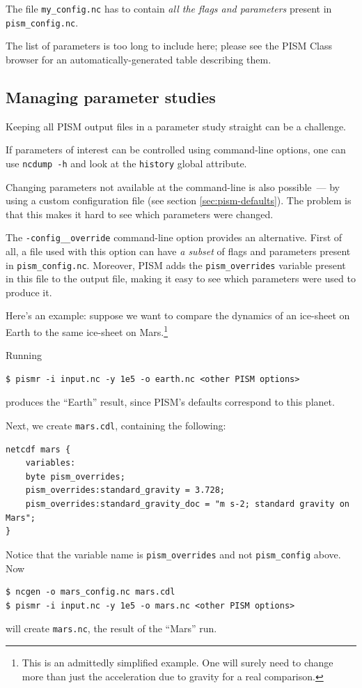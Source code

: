 \documentclass[11pt,final]{amsart}
\newcommand{\und}{\_\!\_}
\newcommand{\pismoptionindex}[1]{\index{options for PISM (and PETSc)!\texttt{-#1}}}
\newcommand{\intextoption}[1]{\texttt{-#1}\pismoptionindex{#1}}
\begin{document}
The file \verb|my_config.nc| has to contain \emph{all the flags and parameters} present in \verb|pism_config.nc|.

The list of parameters is too long to include here; please see the PISM Class browser for an automatically-generated table describing them.


\subsection{Managing parameter studies}
\label{sec:parameter-studies}
Keeping all PISM output files in a parameter study straight can be a challenge.

If parameters of interest can be controlled using command-line options, one can use \verb|ncdump -h| and look at the \verb|history| global attribute.

Changing parameters not available at the command-line is also possible~--- by using a custom configuration file (see section \ref{sec:pism-defaults}). The problem is that this makes it hard to see which parameters were changed.

The \intextoption{config\und override} command-line option provides an alternative. First of all, a file used with this option can have \emph{a subset} of flags and parameters present in \verb|pism_config.nc|. Moreover, PISM adds the \verb|pism_overrides| variable present in this file to the output file, making it easy to see which parameters were used to produce it.

Here's an example: suppose we want to compare the dynamics of an ice-sheet on Earth to the same ice-sheet on Mars.\footnote{This is an admittedly simplified example. One will surely need to change more than just the acceleration due to gravity for a real comparison.}

Running
\begin{verbatim}
$ pismr -i input.nc -y 1e5 -o earth.nc <other PISM options>
\end{verbatim}
produces the ``Earth'' result, since PISM's defaults correspond to this planet.

Next, we create \verb|mars.cdl|, containing the following:
\small
\begin{verbatim}
netcdf mars {
    variables:
    byte pism_overrides;
    pism_overrides:standard_gravity = 3.728;
    pism_overrides:standard_gravity_doc = "m s-2; standard gravity on Mars";
}
\end{verbatim}
\normalsize
Notice that the variable name is \verb|pism_overrides| and not \verb|pism_config| above. Now
\begin{verbatim}
$ ncgen -o mars_config.nc mars.cdl
$ pismr -i input.nc -y 1e5 -o mars.nc <other PISM options>
\end{verbatim}
will create \verb|mars.nc|, the result of the ``Mars'' run.
\end{document}
